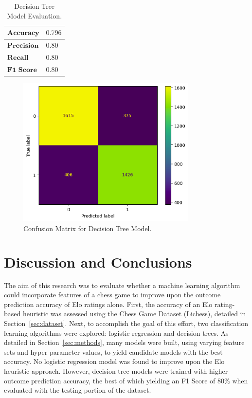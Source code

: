 \documentclass[12pt]{article}
\begin{document}
\begin{table}[h!]
\centering
\begin{tabular}{|l|l|}
\hline
$\textbf{Accuracy}$ & $0.796$ \\ \hline
$\textbf{Precision}$ & $0.80$ \\ \hline
$\textbf{Recall}$ & $0.80$ \\ \hline
$\textbf{F1 Score}$ & $0.80$ \\ \hline
\end{tabular}
\caption{Decision Tree Model Evaluation.}
\label{tab:dt-eval}
\end{table}

\begin{figure}[H]
\centering
\includegraphics[width=0.8\textwidth]{conf-matrix-dt.png}
\caption{Confusion Matrix for Decision Tree Model.}
\label{fig:conf-matrix-dt}
\end{figure}


\section{Discussion and Conclusions}
\label{sec:discussion}

The aim of this research was to evaluate whether a machine learning algorithm could incorporate features of a chess game to improve upon the outcome prediction accuracy of Elo ratings alone. First, the accuracy of an Elo rating-based heuristic was assessed using the Chess Game Dataset (Lichess), detailed in Section~\ref{sec:dataset}. Next, to accomplish the goal of this effort, two classification learning algorithms were explored: logistic regression and decision trees. As detailed in Section~\ref{sec:methods}, many models were built, using varying feature sets and hyper-parameter values, to yield candidate models with the best accuracy. No logistic regression model was found to improve upon the Elo heuristic approach. However, decision tree models were trained with higher outcome prediction accuracy, the best of which yielding an F1 Score of $80\%$ when evaluated with the testing portion of the dataset.
\end{document}
